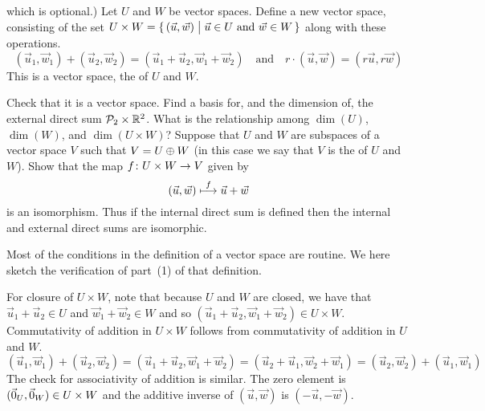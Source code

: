 \begin{exercises}
{    which is optional.)} 
    Let \( U \) and \( W \) be vector spaces.
    Define a new vector space, consisting of the set
    \( U\times W=\mbox{$\{\,(\vec{u},\vec{w})  \bigm|  \vec{u}\in U\text{\ and\ }
                                                   \vec{w}\in W\,\}$}  \)
    along with these operations.
    \begin{equation*}
      (\vec{u}_1,\vec{w}_1)+(\vec{u}_2,\vec{w}_2)=
          (\vec{u}_1+\vec{u}_2,\vec{w}_1+\vec{w}_2)
      \quad\text{and}\quad
      r\cdot (\vec{u},\vec{w})=(r\vec{u},r\vec{w})
    \end{equation*}
    This is a vector space,
    the %
     of \( U \) and \( W \).
    \begin{exparts}
      \partsitem Check that it is a vector space. 
      \partsitem Find a basis for, and the dimension of,
        the external direct sum \( \mathcal{P}_2\times\mathbb{R}^2 \).
      \partsitem What is the relationship among
        \( \dim(U) \), \( \dim(W) \), and \( \dim(U\times W) \)?
      \partsitem Suppose that \( U \) and \( W \) are subspaces of a vector
        space \( V \) such that \( V=U\oplus W \)
        (in this case we say that $V$ is the 
         of $U$ and $W$).
        Show that the map \( \mbox{$f\colon U\times W\to V$} \) given by
        \begin{equation*}
          (\vec{u},\vec{w})\stackrel{f}{\longmapsto} \vec{u}+\vec{w}
        \end{equation*}
        is an isomorphism. 
        Thus if the internal direct sum is defined
        then the internal and external direct sums are isomorphic.
    \end{exparts}
    \begin{answer}
      \begin{exparts}
        \partsitem Most of the conditions in the definition of a
          vector space are routine.
          We here sketch the verification of part~(1) of that definition.

          For closure of $U\times W$, note that because 
          \( U \) and \( W \) are closed, we have that
          $\vec{u}_1+\vec{u}_2\in U$ and $\vec{w}_1+\vec{w}_2\in W$
          and so \( (\vec{u}_1+\vec{u}_2,\vec{w}_1+\vec{w}_2)\in U\times W \).
          Commutativity of addition in \( U\times W \) follows from
          commutativity of addition in \( U \) and \( W \).
          \begin{equation*}
             (\vec{u}_1,\vec{w}_1)+(\vec{u}_2,\vec{w}_2)=
                 (\vec{u}_1+\vec{u}_2,\vec{w}_1+\vec{w}_2)
                 =(\vec{u}_2+\vec{u}_1,\vec{w}_2+\vec{w}_1)
             =(\vec{u}_2,\vec{w}_2)+(\vec{u}_1,\vec{w}_1)
          \end{equation*}
          The check for associativity of addition is similar.
          The zero element is \( (\vec{0}_U,\vec{0}_W)\in U\times W \) 
          and the additive inverse of
          \( (\vec{u},\vec{w}) \) is \( (-\vec{u},-\vec{w}) \).


\end{exparts}
\end{answer}
\end{exercises}
